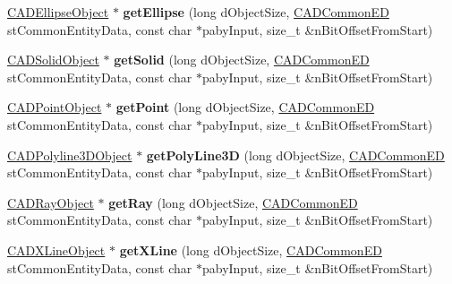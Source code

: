 \begin{DoxyCompactItemize}
\item 
\hyperlink{class_c_a_d_ellipse_object}{C\+A\+D\+Ellipse\+Object} $\ast$ {\bfseries get\+Ellipse} (long d\+Object\+Size, \hyperlink{struct_c_a_d_common_e_d}{C\+A\+D\+Common\+ED} st\+Common\+Entity\+Data, const char $\ast$paby\+Input, size\+\_\+t \&n\+Bit\+Offset\+From\+Start)\hypertarget{class_d_w_g_file_r2000_a5aacc129fdb56b60a9aeb7370e5a106a}{}\label{class_d_w_g_file_r2000_a5aacc129fdb56b60a9aeb7370e5a106a}

\item 
\hyperlink{class_c_a_d_solid_object}{C\+A\+D\+Solid\+Object} $\ast$ {\bfseries get\+Solid} (long d\+Object\+Size, \hyperlink{struct_c_a_d_common_e_d}{C\+A\+D\+Common\+ED} st\+Common\+Entity\+Data, const char $\ast$paby\+Input, size\+\_\+t \&n\+Bit\+Offset\+From\+Start)\hypertarget{class_d_w_g_file_r2000_a371552427840b64e277c3ae05bdc580f}{}\label{class_d_w_g_file_r2000_a371552427840b64e277c3ae05bdc580f}

\item 
\hyperlink{class_c_a_d_point_object}{C\+A\+D\+Point\+Object} $\ast$ {\bfseries get\+Point} (long d\+Object\+Size, \hyperlink{struct_c_a_d_common_e_d}{C\+A\+D\+Common\+ED} st\+Common\+Entity\+Data, const char $\ast$paby\+Input, size\+\_\+t \&n\+Bit\+Offset\+From\+Start)\hypertarget{class_d_w_g_file_r2000_a26b453c21456737baef9bf30f88d08ec}{}\label{class_d_w_g_file_r2000_a26b453c21456737baef9bf30f88d08ec}

\item 
\hyperlink{class_c_a_d_polyline3_d_object}{C\+A\+D\+Polyline3\+D\+Object} $\ast$ {\bfseries get\+Poly\+Line3D} (long d\+Object\+Size, \hyperlink{struct_c_a_d_common_e_d}{C\+A\+D\+Common\+ED} st\+Common\+Entity\+Data, const char $\ast$paby\+Input, size\+\_\+t \&n\+Bit\+Offset\+From\+Start)\hypertarget{class_d_w_g_file_r2000_a04327b1684c7baf98dc4f174b6303c8d}{}\label{class_d_w_g_file_r2000_a04327b1684c7baf98dc4f174b6303c8d}

\item 
\hyperlink{class_c_a_d_ray_object}{C\+A\+D\+Ray\+Object} $\ast$ {\bfseries get\+Ray} (long d\+Object\+Size, \hyperlink{struct_c_a_d_common_e_d}{C\+A\+D\+Common\+ED} st\+Common\+Entity\+Data, const char $\ast$paby\+Input, size\+\_\+t \&n\+Bit\+Offset\+From\+Start)\hypertarget{class_d_w_g_file_r2000_ad18d20ec4cefc69c7448e5bb414d4090}{}\label{class_d_w_g_file_r2000_ad18d20ec4cefc69c7448e5bb414d4090}

\item 
\hyperlink{class_c_a_d_x_line_object}{C\+A\+D\+X\+Line\+Object} $\ast$ {\bfseries get\+X\+Line} (long d\+Object\+Size, \hyperlink{struct_c_a_d_common_e_d}{C\+A\+D\+Common\+ED} st\+Common\+Entity\+Data, const char $\ast$paby\+Input, size\+\_\+t \&n\+Bit\+Offset\+From\+Start)\hypertarget{class_d_w_g_file_r2000_a5414536cf43721e28e6baeaa4d5a94a1}{}\label{class_d_w_g_file_r2000_a5414536cf43721e28e6baeaa4d5a94a1}


\end{DoxyCompactItemize}
